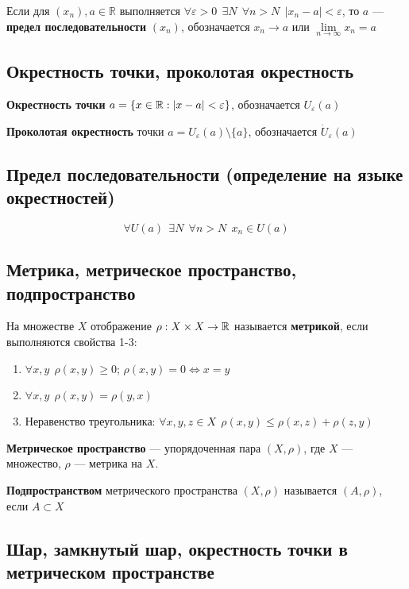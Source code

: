 Если для $(x_n), a\in\mathbb{R}$ выполняется
$\forall \varepsilon > 0 \ \ \exists N \ \ \forall n>N \ \ |x_n-a|<\varepsilon$,
то $a$ --- \textbf{предел последовательности} $(x_n)$, обозначается $x_n\to a$ или $\lim\limits_{n\to\infty}x_n=a$

\subsection{Окрестность точки, проколотая окрестность}

\textbf{Окрестность точки} $a = \{x\in\operatorname*{\mathbb{R}}: |x-a|<\varepsilon\}$, обозначается $U_\varepsilon(a)$


\textbf{Проколотая окрестность} точки $a = U_\varepsilon(a)\setminus \{a\}$, обозначается $\dot U_\varepsilon(a)$

\subsection{Предел последовательности (определение на языке окрестностей)}

$$\forall U(a) \ \ \exists N \ \ \forall n>N \ \ x_n\in U(a)$$

\subsection{Метрика, метрическое пространство, подпространство}

На множестве $X$ отображение $\rho: X\times X\to \operatorname*{\mathbb{R}}$ называется \textbf{метрикой}, если выполняются свойства 1-3:

\begin{enumerate}
    \itemsep0em
    \item $\forall x,y \ \ \rho(x,y)\geq 0$; $\rho(x,y)=0 \Leftrightarrow x=y$
    \item $\forall x,y \ \ \rho(x,y)=\rho(y,x)$
    \item Неравенство треугольника: $\forall x,y,z\in X \ \ \rho(x,y)\leq \rho(x,z)+\rho(z,y)$
\end{enumerate}

\textbf{Метрическое пространство} --- упорядоченная пара $(X, \rho)$, где $X$ --- множество, $\rho$ --- метрика на $X$.

\textbf{Подпространством} метрического пространства $(X,\rho)$ называется $(A, \rho)$, если $A\subset X$

\subsection{Шар, замкнутый шар, окрестность точки в метрическом пространстве}


